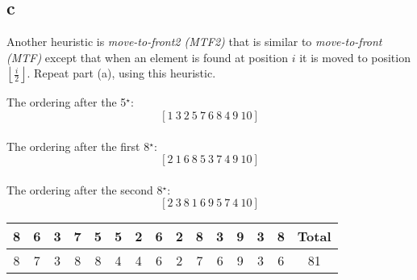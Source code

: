 \documentclass[12pt]{article}
\begin{document}
\begin{enumerate}
		\part{c} Another heuristic is \textit{move-to-front2 (MTF2)} that is similar to
		\textit{move-to-front (MTF)} except that when an element is found at position $i$ it is moved to position $\left \lfloor \frac{i}{2} \right \rfloor$.  
		Repeat part (a), using this heuristic.  
		
		The ordering after the 5$^\star$:
		\[
		[1\ 3\ 2\ 5\ 7\ 6\ 8\ 4\ 9\ 10]
		\]\\
		The ordering after the first 8$^\star$:
		\[
		[2\ 1\ 6\ 8\ 5\ 3\ 7\ 4\ 9\ 10]
		\]\\
		The ordering after the second 8$^\star$:
		\[
		[2\ 3\ 8\ 1\ 6\ 9\ 5\ 7\ 4\ 10]
		\]
		\begin{center}
			\begin{tabular}{|c|c|c|c|c|c|c|c|c|c|c|c|c|c||c|} \hline
				8 & 6 & 3 & 7 & 5 & 5 & 2 & 6 & 2 & 8 & 3 & 9 & 3 & 8 & Total \\ \hline
				8 & 7 & 3 & 8 & 8 & 4 & 4 & 6 & 2 & 7 & 6 & 9 & 3 & 6 &  81\\ \hline
			\end{tabular}
		\end{center}
		
	\end{enumerate}
	
\end{document}
